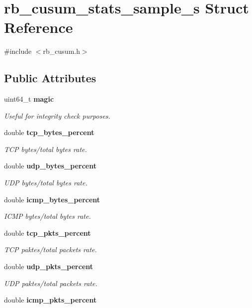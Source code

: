 \section{rb\+\_\+cusum\+\_\+stats\+\_\+sample\+\_\+s Struct Reference}
\label{structrb__cusum__stats__sample__s}


{\ttfamily \#include $<$rb\+\_\+cusum.\+h$>$}

\subsection*{Public Attributes}
\begin{DoxyCompactItemize}
\item 
uint64\+\_\+t {\bf magic}
\begin{DoxyCompactList}\small\item\em Useful for integrity check purposes. \end{DoxyCompactList}\item 
double {\bf tcp\+\_\+bytes\+\_\+percent}
\begin{DoxyCompactList}\small\item\em T\+C\+P bytes/total bytes rate. \end{DoxyCompactList}\item 
double {\bf udp\+\_\+bytes\+\_\+percent}
\begin{DoxyCompactList}\small\item\em U\+D\+P bytes/total bytes rate. \end{DoxyCompactList}\item 
double {\bf icmp\+\_\+bytes\+\_\+percent}
\begin{DoxyCompactList}\small\item\em I\+C\+M\+P bytes/total bytes rate. \end{DoxyCompactList}\item 
double {\bf tcp\+\_\+pkts\+\_\+percent}
\begin{DoxyCompactList}\small\item\em T\+C\+P paktes/total packets rate. \end{DoxyCompactList}\item 
double {\bf udp\+\_\+pkts\+\_\+percent}
\begin{DoxyCompactList}\small\item\em U\+D\+P paktes/total packets rate. \end{DoxyCompactList}\item 
double {\bf icmp\+\_\+pkts\+\_\+percent}

\end{DoxyCompactItemize}
